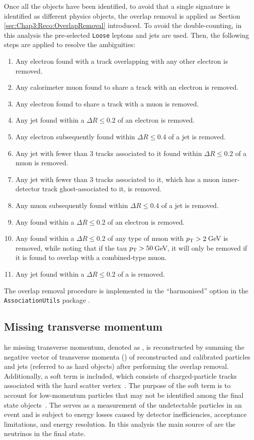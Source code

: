 Once all the objects have been identified, to avoid that a single signature 
is identified as different physics objects, the overlap removal is applied as
Section \ref{sec:Chap3:Reco:OverlapRemoval} introduced.
To avoid the double-counting, in this analysis the pre-selected \texttt{Loose} 
leptons and jets are used. Then, the following steps are applied to resolve
the ambiguities:
\begin{enumerate}
  \item Any electron found with a track overlapping with any other electron is removed.
  \item Any calorimeter muon found to share a track with an electron is removed.
  \item Any electron found to share a track with a muon is removed.
  \item Any jet found within a $\Delta R \leq 0.2$ of an electron is removed.
  \item Any electron subsequently found within $\Delta R \leq 0.4$ of a jet is removed.
  \item Any jet with fewer than 3 tracks associated to it found within $\Delta R \leq 0.2$ of a muon is removed.
  \item Any jet with fewer than 3 tracks associated to it, which has a muon inner-detector track ghost-associated to it, is removed.
  \item Any muon subsequently found within $\Delta R \leq 0.4$ of a jet is removed.
  \item Any \tauhad found within a $\Delta R \leq 0.2$ of an electron is removed.
  \item Any \tauhad found within a $\Delta R \leq 0.2$ of any type of muon with $p_{\text{T}} > 2\,$GeV is removed, 
  	while noting that if the tau $p_{\text{T}} > 50\,$GeV, it will only be removed if it is found to overlap with a combined-type muon.
  \item Any jet found within a $\Delta R \leq 0.2$ of a \tauhad is removed.
\end{enumerate}
The overlap removal procedure is implemented in the \enquote{harmonised} option in the \texttt{AssociationUtils} package \cite{OR}.

%
%
\subsection{Missing transverse momentum}
he missing transverse momentum, denoted as \MET, is reconstructed by summing the 
negative vector of transverse momenta (\pT) of reconstructed and calibrated particles and 
jets (referred to as hard objects) after performing the overlap removal. 
Additionally, a soft term is included, which consists of charged-particle tracks associated 
with the hard scatter vertex~\cite{PERF-2016-07}\cite{ATLAS-CONF-2018-023}. The purpose of
the soft term is to account for low-momentum particles that may not be identified among the 
final state objects~\cite{PERF-2011-07}\cite{PERF-2014-04}\cite{ATL-PHYS-PUB-2015-027}. 
The \MET serves as a measurement of the undetectable particles in an event and is subject to 
energy losses caused by detector inefficiencies, acceptance limitations, and energy resolution.
In this analysis the main source of \MET are the neutrinos in the final state.

